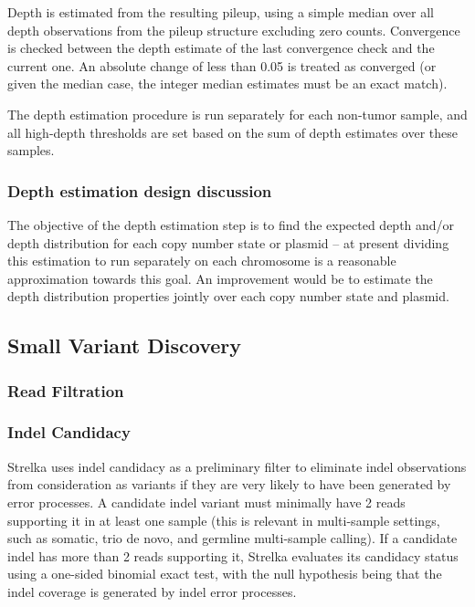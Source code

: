 \documentclass{article}
\begin{document}
Depth is estimated from the resulting pileup, using a simple median over all depth observations from the pileup structure excluding zero counts. Convergence is checked between the depth estimate of the last convergence check and the current one. An absolute change of less than 0.05 is treated as converged (or given the median case, the integer median estimates must be an exact match).

The depth estimation procedure is run separately for each non-tumor sample, and all high-depth thresholds are set based on the sum of depth estimates over these samples.

\subsubsection{Depth estimation design discussion}

The objective of the depth estimation step is to find the expected depth and/or depth distribution for each copy number state or plasmid -- at present dividing this estimation to run separately on each chromosome is a reasonable approximation towards this goal. An improvement would be to estimate the depth distribution properties jointly over each copy number state and plasmid.

\subsection{Small Variant Discovery}

\subsubsection{Read Filtration}

\subsubsection{Indel Candidacy}

Strelka uses indel candidacy as a preliminary filter to eliminate indel observations from consideration as variants if they are very likely to have been generated by error processes.  A candidate indel variant must minimally have 2 reads supporting it in at least one sample (this is relevant in multi-sample settings, such as somatic, trio de novo, and germline multi-sample calling).  If a candidate indel has more than 2 reads supporting it, Strelka evaluates its candidacy status using a one-sided binomial exact test, with the null hypothesis being that the indel coverage is generated by indel error processes.
\end{document}
